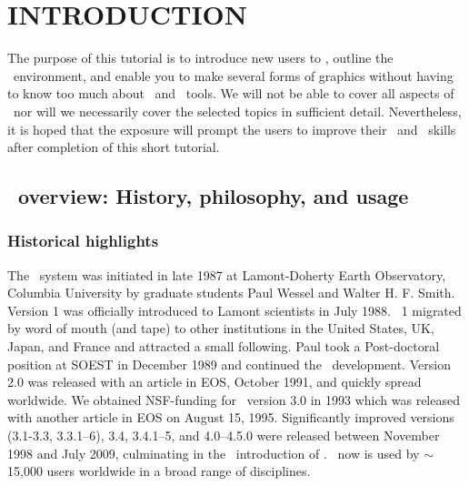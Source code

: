 \documentclass[11pt]{report}
\begin{document}

\clearpage

\tableofcontents

\pagestyle{headings}

\chapter*{INTRODUCTION} 

The purpose of this tutorial is to introduce new users to \GMT,
outline the \GMT\ environment, and enable you to make several
forms of graphics without having to know too much about \UNIX\
and \UNIX\ tools.  We will not be able to cover all aspects of
\GMT\ nor will we necessarily cover the selected topics in
sufficient detail.  Nevertheless, it is hoped that the exposure
will prompt the users to improve their \GMT\ and \UNIX\ skills
after completion of this short tutorial.

\section*{\gmt\ overview: History, philosophy, and usage}

\subsection*{Historical highlights}

The \GMT\ system was initiated in late 1987 at Lamont-Doherty
Earth Observatory, Columbia University by graduate students Paul
Wessel and Walter H. F. Smith.  Version 1 was officially introduced
to Lamont scientists in July 1988.  \GMT\ 1 migrated by word of mouth
(and tape) to other institutions in the United States, UK, Japan, and
France and attracted a small following.  Paul took a Post-doctoral
position at SOEST in December 1989 and continued the \GMT\ development.
Version 2.0 was released with an article in EOS, October 1991, and
quickly spread worldwide.  We obtained NSF-funding for \GMT\
version 3.0 in 1993 which was released with another article in EOS
on August 15, 1995.  Significantly improved versions (3.1-3.3,
3.3.1--6), 3.4, 3.4.1--5, and 4.0--4.5.0 were released between November 1998 and
July 2009, culminating in the \GMTDOCDATE\ introduction of \GMTDOCVERSION.
\GMT\ now is used by $\sim$15,000 users worldwide in a broad range of disciplines.
\end{document}
